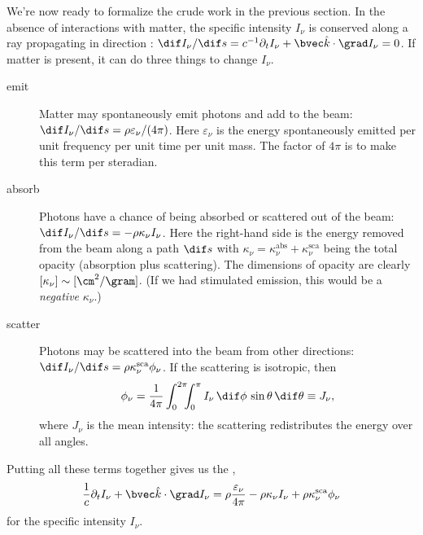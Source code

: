 We're now ready to formalize the crude work in the previous section.
In the absence of interactions with matter, the specific intensity $I_{\nu}$ is conserved along a ray propagating in direction \unitk: $\dif I_{\nu}/\dif s = c^{-1}\partial_{t}I_{\nu} + \unitk\cdot\grad I_{\nu} = 0$. If matter is present, it can do three things to change $I_{\nu}$.
\begin{description}
\item[emit] Matter may spontaneously emit photons and add to the beam: $\dif I_{\nu}/\dif s = \rho\varepsilon_{\nu}/(4\pi)$. Here $\varepsilon_{\nu}$ is the energy spontaneously emitted per unit frequency per unit time per unit mass.  The factor of $4\pi$ is to make this term per steradian.

\item[absorb] Photons have a chance of being absorbed or scattered out of the beam: $\dif I_{\nu}/\dif s = -\rho\kappa_{\nu}I_{\nu}$. Here the right-hand side is the energy removed from the beam along a path $\dif s$ with $\kappa_{\nu} = \kappa_{\nu}^{\mathrm{abs}} + \kappa_{\nu}^{\mathrm{sca}}$ being the total opacity (absorption plus scattering). The dimensions of opacity are clearly $[\kappa_{\nu}] \sim [\cm^{2}/\gram]$. (If we had stimulated emission, this would be a \emph{negative} $\kappa_{\nu}$.)

\item[scatter] Photons may be scattered into the beam from other directions: $\dif I_{\nu}/\dif s = \rho\kappa_{\nu}^{\mathrm{sca}}\phi_{\nu}$. If the scattering is isotropic, then
\begin{equation}\label{e.isosca}
\phi_{\nu} = \frac{1}{4\pi}\int_{0}^{2\pi}\!\!\!\int_{0}^{\pi} I_{\nu}\,\dif\phi\,\sin\theta\,\dif\theta \equiv J_{\nu},
\end{equation}
where $J_{\nu}$ is the mean intensity: the scattering redistributes the energy over all angles.
\end{description}
Putting all these terms together gives us the ,
\begin{equation}\label{e.transfer}
\frac{1}{c}\partial_{t}I_{\nu} + \unitk\cdot\grad I_{\nu} = \rho \frac{\varepsilon_{\nu}}{4\pi} - \rho\kappa_{\nu} I_{\nu} + \rho\kappa_{\nu}^{\mathrm{sca}}\phi_{\nu}
\end{equation}
for the specific intensity $I_{\nu}$.

